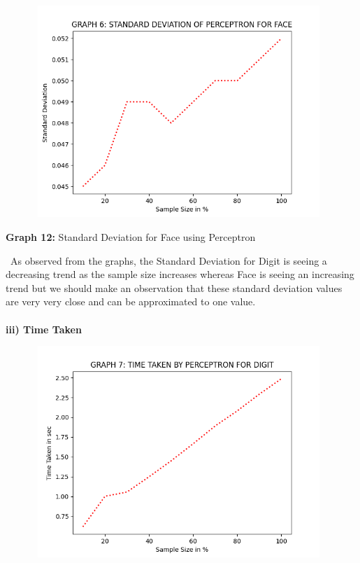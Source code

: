 \documentclass[10 pt]{report}   	%
\begin{document}
{\begin{center}
\end{center}
\begin{figure} [H]
\includegraphics [width = 11cm, height = 8cm]{PERC_STD_FACE.png}
\end {figure}
\begin{center}
\small \textbf {Graph 12:} Standard Deviation for Face using Perceptron\\
\end{center}
\textbullet\ As observed from the graphs, the Standard Deviation for Digit is seeing a decreasing trend as the sample size increases whereas Face is seeing an increasing trend but we should make an observation that these standard deviation values are very very close and can be approximated to one value.\\ \\
\textbf{iii) Time Taken}
\begin{figure} [H]
\includegraphics [width = 11cm, height = 8cm]{PERC_TIME_DIGIT.png}
\end {figure}
\begin{center}

\end{center}}
\end{document}
